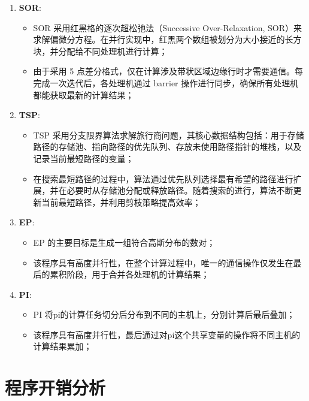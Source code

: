 {\begin{enumerate}[leftmargin=1em, align=left]
\begin{itemize}[leftmargin=*, nosep]
        \end{itemize}
    \item \textbf{SOR}: 
        \begin{itemize}[leftmargin=*, nosep]
            \item SOR 采用红黑格的逐次超松弛法（Successive Over-Relaxation, SOR）来求解偏微分方程。在并行实现中，红黑两个数组被划分为大小接近的长方块，并分配给不同处理机进行计算；
            \item 由于采用 5 点差分格式，仅在计算涉及带状区域边缘行时才需要通信。每完成一次迭代后，各处理机通过 barrier 操作进行同步，确保所有处理机都能获取最新的计算结果；
        \end{itemize}
    \item \textbf{TSP}: 
        \begin{itemize}[leftmargin=*, nosep]
            \item TSP 采用分支限界算法求解旅行商问题，其核心数据结构包括：用于存储路径的存储池、指向路径的优先队列、存放未使用路径指针的堆栈，以及记录当前最短路径的变量；
            \item 在搜索最短路径的过程中，算法通过优先队列选择最有希望的路径进行扩展，并在必要时从存储池分配或释放路径。随着搜索的进行，算法不断更新当前最短路径，并利用剪枝策略提高效率；
        \end{itemize}
    \item \textbf{EP}: 
        \begin{itemize}[leftmargin=*, nosep]
            \item EP 的主要目标是生成一组符合高斯分布的数对；
            \item 该程序具有高度并行性，在整个计算过程中，唯一的通信操作仅发生在最后的累积阶段，用于合并各处理机的计算结果；
        \end{itemize}
    \item \textbf{PI}: 
        \begin{itemize}[leftmargin=*, nosep]
            \item PI 将pi的计算任务切分后分布到不同的主机上，分别计算后最后叠加；
            \item 该程序具有高度并行性，最后通过对pi这个共享变量的操作将不同主机的计算结果累加；
        \end{itemize}
\end{enumerate}

\section{程序开销分析}

}
